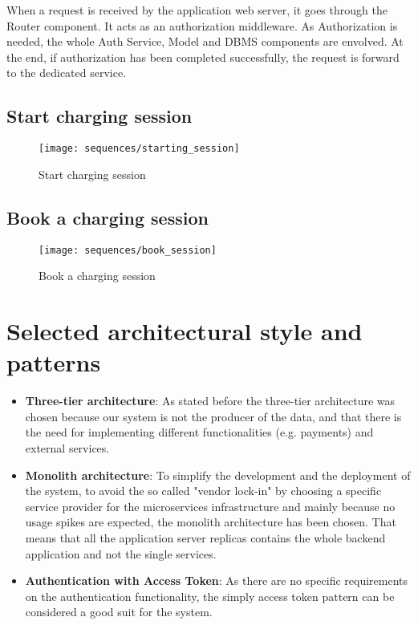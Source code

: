 When a request is received by the application web server, it goes through the Router component. It acts as an authorization middleware. 
As Authorization is needed, the whole Auth Service, Model and DBMS components are envolved.
At the end, if authorization has been completed successfully, the request is forward to the dedicated service.
	
	
\subsection{Start charging session}
\begin{figure}[h]
\texttt{[image: sequences/starting\_session]}
\caption{Start charging session}
\end{figure}
\clearpage
	
\subsection{Book a charging session}
\begin{figure}[h]
\texttt{[image: sequences/book\_session]}
\caption{Book a charging session}
\end{figure}

	
\section{Selected architectural style and patterns}
\begin{itemize}
	\item \textbf{Three-tier architecture}: As stated before the three-tier architecture was chosen because our system is not the producer of the data, and that there is the need for implementing different functionalities (e.g. payments) and external services.
	\item \textbf{Monolith architecture}: To simplify the development and the deployment of the system, to avoid the so called "vendor lock-in" by choosing a specific service provider for the microservices infrastructure and mainly because no usage spikes are expected, the monolith architecture has been chosen. That means that all the application server replicas contains the whole backend application and not the single services.
	\item \textbf{Authentication with Access Token}: As there are no specific requirements on the authentication functionality, the simply access token pattern can be considered a good suit for the system. 
\end{itemize}

















